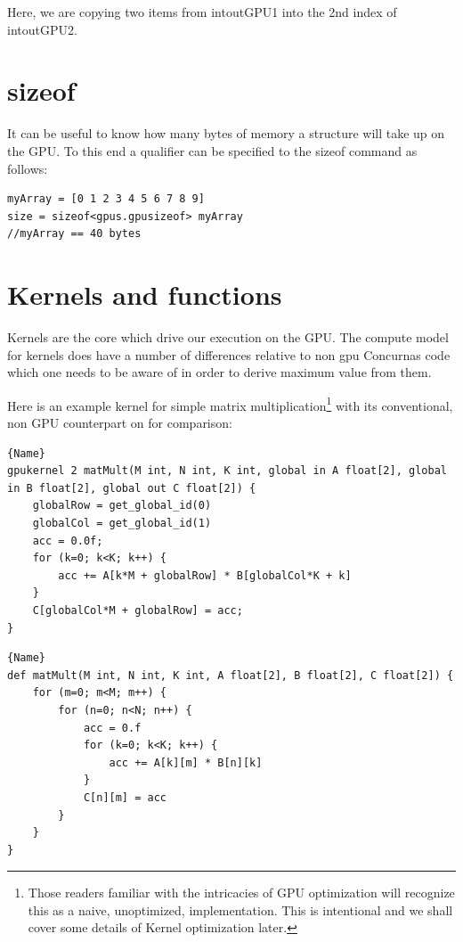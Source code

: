 \documentclass[conc-doc]{subfiles}
\begin{document}
Here, we are copying two items from intoutGPU1 into the 2nd index of intoutGPU2.

\section{sizeof}
It can be useful to know how many bytes of memory a structure will take up on the GPU. To this end a qualifier can be specified to the sizeof command as follows:

\begin{lstlisting}
myArray = [0 1 2 3 4 5 6 7 8 9]
size = sizeof<gpus.gpusizeof> myArray 
//myArray == 40 bytes
\end{lstlisting}

\section{Kernels and functions}
Kernels are the core which drive our execution on the GPU. The compute model for kernels does have a number of differences relative to non gpu Concurnas code which one needs to be aware of in order to derive maximum value from them.

Here is an example kernel for simple matrix multiplication\footnote{Those readers familiar with the intricacies of GPU optimization will recognize this as a naive, unoptimized, implementation. This is intentional and we shall cover some details of Kernel optimization later.} with its conventional, non GPU counterpart on for comparison:

\noindent\begin{minipage}{.45\textwidth}
	\begin{lstlisting}[caption=GPU kernel,frame=tlrb]{Name}
gpukernel 2 matMult(M int, N int, K int, global in A float[2], global in B float[2], global out C float[2]) {
	globalRow = get_global_id(0) 
	globalCol = get_global_id(1) 
	acc = 0.0f;
	for (k=0; k<K; k++) {
		acc += A[k*M + globalRow] * B[globalCol*K + k]
	}
	C[globalCol*M + globalRow] = acc;
} 
\end{lstlisting}
\end{minipage}\hfill
\begin{minipage}{.45\textwidth}
	\begin{lstlisting}[caption=CPU equivilent,frame=tlrb]{Name}
def matMult(M int, N int, K int, A float[2], B float[2], C float[2]) {
	for (m=0; m<M; m++) {
		for (n=0; n<N; n++) {
			acc = 0.f
			for (k=0; k<K; k++) {
				acc += A[k][m] * B[n][k]
			}
			C[n][m] = acc
		}
	}
}
\end{lstlisting}
\end{minipage}
\end{document}
